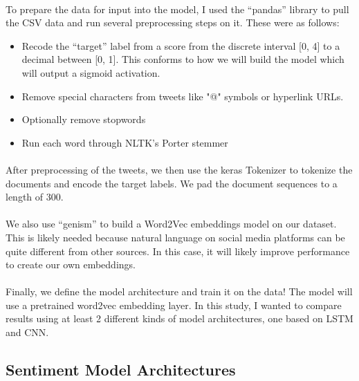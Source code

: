 \documentclass{article}
\begin{document}
\paragraph{} To prepare the data for input into the model, I used the ``pandas'' library to pull the CSV data and run several preprocessing steps on it. These were as follows:

\begin{itemize}
    \item Recode the ``target'' label from a score from the discrete interval [0, 4] to a decimal between [0, 1]. This conforms to how we will build the model which will output a sigmoid activation.
    \item Remove special characters from tweets like "@" symbols or hyperlink URLs.
    \item Optionally remove stopwords
    \item Run each word through NLTK's Porter stemmer
\end{itemize}

\paragraph{} After preprocessing of the tweets, we then use the keras Tokenizer to tokenize the documents and encode the target labels. We pad the document sequences to a length of 300.

\paragraph{} We also use ``genism'' to build a Word2Vec embeddings model on our dataset. This is likely needed because natural language on social media platforms can be quite different from other sources. In this case, it will likely improve performance to create our own embeddings.

\paragraph{} Finally, we define the model architecture and train it on the data! The model will use a pretrained word2vec embedding layer. In this study, I wanted to compare results using at least 2 different kinds of model architectures, one based on LSTM and CNN.

\subsection{Sentiment Model Architectures}
\end{document}
